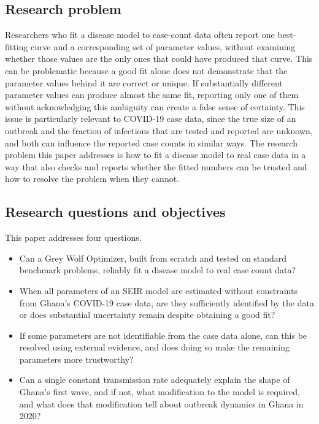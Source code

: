 \documentclass[journal]{IEEEtran}
\begin{document}
\subsection{Research problem}

Researchers who fit a disease model to case-count data often report one best-fitting curve and a corresponding set of parameter values, without examining whether those values are the only ones that could have produced that curve. This can be problematic because a good fit alone does not demonstrate that the parameter values behind it are correct or unique. If substantially different parameter values can produce almost the same fit, reporting only one of them without acknowledging this ambiguity can create a
false sense of certainty. This issue is particularly relevant to COVID-19 case data, since the true size of an outbreak and the fraction of infections that are tested and reported are unknown, and both can influence the reported case counts in similar ways. The research problem this paper addresses is how to fit a disease model to real case data in a way that also checks and reports whether the fitted numbers can be trusted and how to resolve the problem when they cannot.

\subsection{Research questions and objectives}

This paper addresses four questions. 
\begin{itemize}
    \item Can a Grey Wolf Optimizer, built from scratch and tested on standard benchmark problems, reliably fit a disease model to real case count data?
    \item When all parameters of an SEIR model are estimated without constraints from Ghana's COVID-19 case data, are they sufficiently identified by the data or does substantial uncertainty remain despite obtaining a good fit?
    \item  If some parameters are not identifiable from the case data alone, can this be resolved using external evidence, and does doing so make the remaining parameters more trustworthy?
    \item Can a single constant transmission rate adequately  explain the shape of Ghana's first wave, and if not, what modification to the model is required, and what does that modification tell about outbreak dynamics in Ghana in 2020?
\end{itemize}
\end{document}
